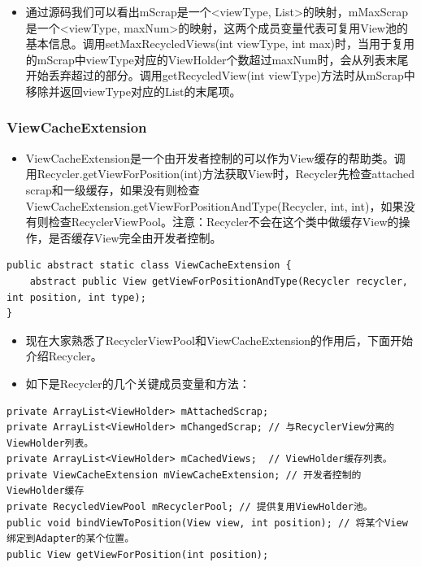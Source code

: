 \documentclass[9pt, b5paper]{article}
\begin{document}
\begin{itemize}
\item 通过源码我们可以看出mScrap是一个<viewType, List>的映射，mMaxScrap是一个<viewType, maxNum>的映射，这两个成员变量代表可复用View池的基本信息。调用setMaxRecycledViews(int viewType, int max)时，当用于复用的mScrap中viewType对应的ViewHolder个数超过maxNum时，会从列表末尾开始丢弃超过的部分。调用getRecycledView(int viewType)方法时从mScrap中移除并返回viewType对应的List的末尾项。
\end{itemize}

\subsubsection{ViewCacheExtension}
\label{sec-5-3-9}
\begin{itemize}
\item ViewCacheExtension是一个由开发者控制的可以作为View缓存的帮助类。调用Recycler.getViewForPosition(int)方法获取View时，Recycler先检查attached scrap和一级缓存，如果没有则检查ViewCacheExtension.getViewForPositionAndType(Recycler, int, int)，如果没有则检查RecyclerViewPool。注意：Recycler不会在这个类中做缓存View的操作，是否缓存View完全由开发者控制。
\end{itemize}
\begin{verbatim}
public abstract static class ViewCacheExtension {
    abstract public View getViewForPositionAndType(Recycler recycler, int position, int type);
}
\end{verbatim}
\begin{itemize}
\item 现在大家熟悉了RecyclerViewPool和ViewCacheExtension的作用后，下面开始介绍Recycler。
\item 如下是Recycler的几个关键成员变量和方法：
\end{itemize}
\begin{verbatim}
private ArrayList<ViewHolder> mAttachedScrap;
private ArrayList<ViewHolder> mChangedScrap; // 与RecyclerView分离的ViewHolder列表。
private ArrayList<ViewHolder> mCachedViews;  // ViewHolder缓存列表。
private ViewCacheExtension mViewCacheExtension; // 开发者控制的ViewHolder缓存
private RecycledViewPool mRecyclerPool; // 提供复用ViewHolder池。
public void bindViewToPosition(View view, int position); // 将某个View绑定到Adapter的某个位置。
public View getViewForPosition(int position);
\end{verbatim}
\end{document}
